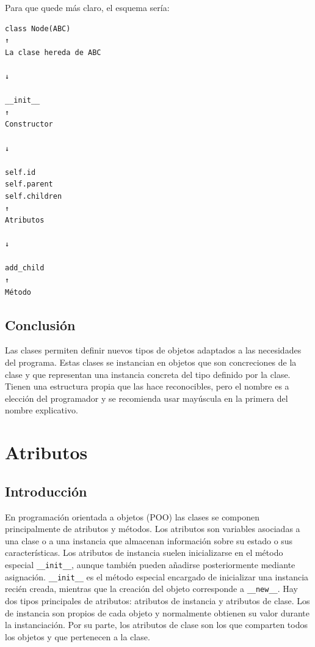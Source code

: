 \documentclass[11pt,a5paper,twoside]{book}
\begin{document}
\newpage
Para que quede más claro, el esquema sería:


\begin{tcolorbox}
\scriptsize
 \begin{verbatim}
class Node(ABC)
↑
La clase hereda de ABC

↓

__init__
↑
Constructor

↓

self.id
self.parent
self.children
↑
Atributos

↓

add_child
↑
Método
\end{verbatim}
\end{tcolorbox}
\subsection{Conclusión}
Las clases permiten definir nuevos tipos de objetos adaptados a las necesidades del programa.
Estas clases se instancian en objetos que son concreciones de la clase y que representan una instancia concreta del tipo definido por la clase.
Tienen una estructura propia que las hace reconocibles, pero el nombre es a elección del programador y se recomienda usar mayúscula en la primera del nombre explicativo.

\newpage

\section{Atributos}
\subsection{Introducción}
En programación orientada a objetos (POO) las clases se componen principalmente de atributos y métodos. Los atributos son variables asociadas a una clase o a una instancia que almacenan información sobre su estado o sus características.
Los atributos de instancia suelen inicializarse en el método especial {\scriptsize \texttt{\_\_init\_\_}}, aunque también pueden añadirse posteriormente mediante asignación. {\scriptsize \texttt{\_\_init\_\_}} es el método especial encargado de inicializar una instancia recién creada, mientras que la creación del objeto corresponde a {\scriptsize \texttt{\_\_new\_\_}}.
Hay dos tipos principales de atributos: atributos de instancia y atributos de clase. Los de instancia son propios de cada objeto y normalmente obtienen su valor durante la instanciación. Por su parte, los atributos de clase son los que comparten todos los objetos y que pertenecen a la clase.
\end{document}
